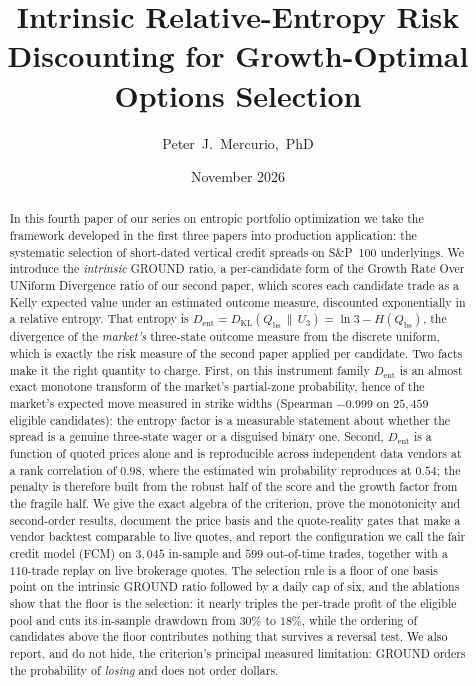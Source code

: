 \documentclass[11pt]{article}
\title{Intrinsic Relative-Entropy Risk Discounting for Growth-Optimal\\
Options Selection}
\author{Peter~J.~Mercurio,~PhD}
\date{November 2026}
\newcommand{\dkl}{D_{\mathrm{KL}}}
\newcommand{\dent}{D_{\mathrm{ent}}}
\newcommand{\Qbs}{Q_{\mathrm{bs}}}
\begin{document}
\maketitle

\begin{abstract}
In this fourth paper of our series on entropic portfolio optimization we take
the framework developed in the first three papers into production application:
the systematic selection of short-dated vertical credit spreads on S\&P~100
underlyings. We introduce the \emph{intrinsic} GROUND ratio, a per-candidate
form of the Growth Rate Over UNiform Divergence ratio of our second paper,
which scores each candidate trade as a Kelly expected value under an estimated
outcome measure, discounted exponentially in a relative entropy. That entropy is
$\dent = \dkl(\Qbs \,\|\, U_3) = \ln 3 - H(\Qbs)$, the divergence of the
\emph{market's} three-state outcome measure from the discrete uniform, which is
exactly the risk measure of the second paper applied per candidate. Two facts
make it the right quantity to charge. First, on this instrument
family $\dent$ is an almost exact monotone transform of the market's
partial-zone probability, hence of the market's expected move measured in
strike widths (Spearman $-0.999$ on $25{,}459$ eligible candidates): the
entropy factor is a measurable statement about whether the spread is a genuine
three-state wager or a disguised binary one. Second, $\dent$ is a function of
quoted prices alone and is reproducible across independent data vendors at a
rank correlation of $0.98$, where the estimated win probability reproduces at
$0.54$; the penalty is therefore built from the robust half of the score and
the growth factor from the fragile half. We give the exact algebra of the
criterion, prove the monotonicity and second-order results, document the price
basis and the quote-reality gates that make a vendor backtest comparable to
live quotes, and report the configuration we call the fair credit model (FCM)
on $3{,}045$ in-sample and $599$ out-of-time trades, together with a
$110$-trade replay on live brokerage quotes. The selection rule is a floor of
one basis point on the intrinsic GROUND ratio followed by a daily cap of six,
and the ablations show that the floor is the selection: it nearly triples
the per-trade profit of the eligible pool and cuts its in-sample drawdown
from $30\%$ to $18\%$, while the
ordering of candidates above the floor contributes nothing that survives a
reversal test. We also report, and do not hide, the criterion's principal
measured limitation: GROUND orders the probability of \emph{losing} and does
not order dollars.
\end{abstract}
\end{document}
